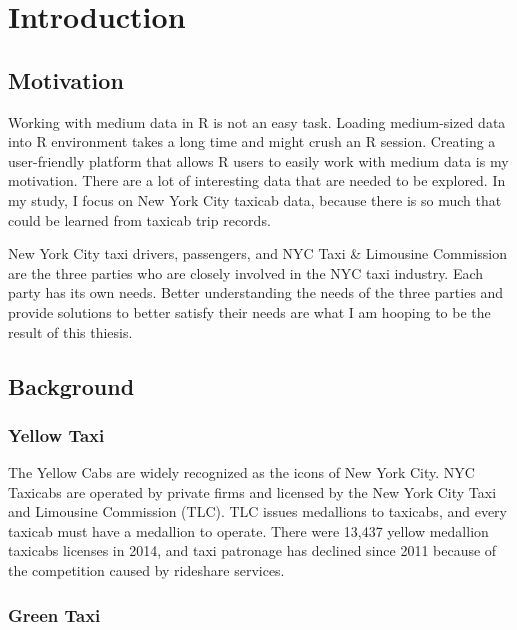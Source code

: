 \documentclass[12pt,twoside]{reedthesis}
\theoremstyle{definition}
\theoremstyle{definition}
\theoremstyle{definition}
\theoremstyle{remark}
\begin{document}
\mainmatter %
\pagestyle{fancyplain} %

\chapter{Introduction}\label{introduction}

\section{Motivation}\label{motivation}

Working with medium data in R is not an easy task. Loading medium-sized
data into R environment takes a long time and might crush an R session.
Creating a user-friendly platform that allows R users to easily work
with medium data is my motivation. There are a lot of interesting data
that are needed to be explored. In my study, I focus on New York City
taxicab data, because there is so much that could be learned from
taxicab trip records.

New York City taxi drivers, passengers, and NYC Taxi \& Limousine
Commission are the three parties who are closely involved in the NYC
taxi industry. Each party has its own needs. Better understanding the
needs of the three parties and provide solutions to better satisfy their
needs are what I am hooping to be the result of this thiesis.

\section{Background}\label{background}

\subsection{Yellow Taxi}\label{yellow-taxi}

The Yellow Cabs are widely recognized as the icons of New York City. NYC
Taxicabs are operated by private firms and licensed by the New York City
Taxi and Limousine Commission (TLC). TLC issues medallions to taxicabs,
and every taxicab must have a medallion to operate. There were 13,437
yellow medallion taxicabs licenses in 2014, and taxi patronage has
declined since 2011 because of the competition caused by rideshare
services.

\subsection{Green Taxi}\label{green-taxi}
\end{document}
